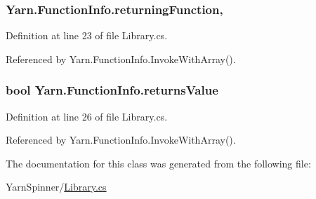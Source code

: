 \hypertarget{a00100_a8b6e0e5a875c427a1d947f3c52c308ca}{
\subsubsection[{returning\-Function}]{ Yarn.\-Function\-Info.\-returning\-Function\hspace{0.3cm}{\ttfamily [get]}, {\ttfamily [set]}}}\label{a00100_a8b6e0e5a875c427a1d947f3c52c308ca}


Definition at line 23 of file Library.\-cs.



Referenced by Yarn.\-Function\-Info.\-Invoke\-With\-Array().

\hypertarget{a00100_acaff044276aa230de7c0b27dd5267bc7}{
\subsubsection[{returns\-Value}]{\setlength{\rightskip}{0pt plus 5cm}bool Yarn.\-Function\-Info.\-returns\-Value\hspace{0.3cm}{\ttfamily [get]}}}\label{a00100_acaff044276aa230de7c0b27dd5267bc7}


Definition at line 26 of file Library.\-cs.



Referenced by Yarn.\-Function\-Info.\-Invoke\-With\-Array().



The documentation for this class was generated from the following file\-:\begin{DoxyCompactItemize}
\item 
Yarn\-Spinner/\hyperlink{a00299}{Library.\-cs}\end{DoxyCompactItemize}

